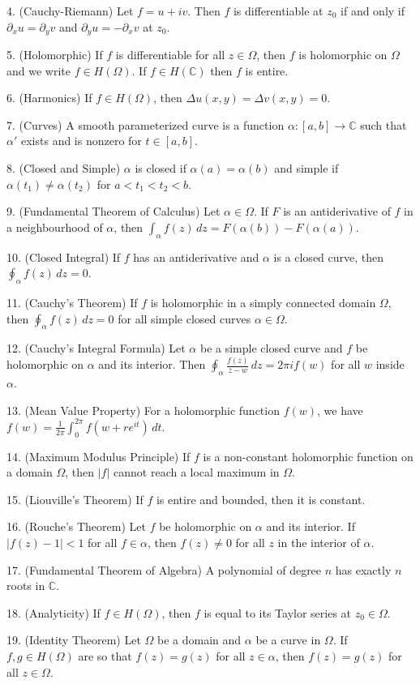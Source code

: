 \documentclass[10pt]{article}
\newcommand{\C}{\mathbb C}
\newcommand{\Om}{\Omega}
\newcommand{\De}{\Delta}
\newcommand{\al}{\alpha}
\newcommand{\pa}{\partial}
\begin{document}
4. (Cauchy-Riemann) Let $f=u+iv$. Then $f$ is differentiable at $z_0$ if and only if $\pa_x u=\pa_y v$ and $\pa_y u=-\pa_x v$ at $z_0$. 

5. (Holomorphic) If $f$ is differentiable for all $z\in\Om$, then $f$ is holomorphic on $\Om$ and we write $f\in H(\Om)$. If $f\in H(\C)$ then $f$ is entire.

6. (Harmonics) If $f\in H(\Om)$, then $\De u(x,y)=\De v(x,y)=0$. 

7. (Curves) A smooth parameterized curve is a function $\al:[a,b]\to\C$ such that $\al'$ exists and is nonzero for $t\in[a,b]$. 

8. (Closed and Simple) $\al$ is closed if $\al(a)=\al(b)$ and simple if $\al(t_1)\neq\al(t_2)$ for $a<t_1<t_2<b$.

9. (Fundamental Theorem of Calculus) Let $\al\in\Om$. If $F$ is an antiderivative of $f$ in a neighbourhood of $\al$, then $\int_\al f(z)\,dz=F(\al(b))-F(\al(a))$.

10. (Closed Integral) If $f$ has an antiderivative and $\al$ is a closed curve, then $\oint_\al f(z)\,dz=0$. 

11. (Cauchy's Theorem) If $f$ is holomorphic in a simply connected domain $\Om$, then $\oint_\al f(z)\,dz=0$ for all simple closed curves $\al\in\Om$.

12. (Cauchy's Integral Formula) Let $\al$ be a simple closed curve and $f$ be holomorphic on $\al$ and its interior. Then $\oint_\al \frac{f(z)}{z-w}\,dz=2\pi if(w)$ for all $w$ inside $\al$.

13. (Mean Value Property) For a holomorphic function $f(w)$, we have $f(w)=\frac{1}{2\pi}\int_0^{2\pi}f(w+re^{it})\,dt$. 

14. (Maximum Modulus Principle) If $f$ is a non-constant holomorphic function on a domain $\Om$, then $|f|$ cannot reach a local maximum in $\Om$. 

15. (Liouville's Theorem) If $f$ is entire and bounded, then it is constant. 

16. (Rouche's Theorem) Let $f$ be holomorphic on $\al$ and its interior. If $|f(z)-1|<1$ for all $f\in\al$, then $f(z)\ne 0$ for all $z$ in the interior of $\al$. 

17. (Fundamental Theorem of Algebra) A polynomial of degree $n$ has exactly $n$ roots in $\C$. 

18. (Analyticity) If $f\in H(\Om)$, then $f$ is equal to its Taylor series at $z_0\in\Om$. 

19. (Identity Theorem) Let $\Om$ be a domain and $\al$ be a curve in $\Om$. If $f,g\in H(\Om)$ are so that $f(z)=g(z)$ for all $z\in\al$, then $f(z)=g(z)$ for all $z\in\Om$. 
\end{document}
